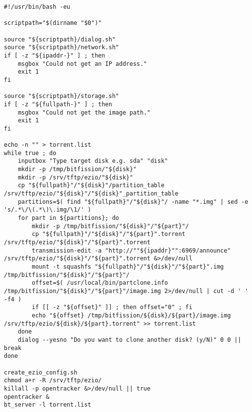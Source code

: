 \begin{minipage}{\textwidth}
\begin{lstlisting}[caption={The Shell Script of BitFission Server}]
#!/usr/bin/bash -eu

scriptpath="$(dirname "$0")"

source "${scriptpath}/dialog.sh"
source "${scriptpath}/network.sh"
if [ -z "${ipaddr-}" ] ; then
	msgbox "Could not get an IP address."
	exit 1
fi

source "${scriptpath}/storage.sh"
if [ -z "${fullpath-}" ] ; then
	msgbox "Could not get the image path."
	exit 1
fi

echo -n "" > torrent.list
while true ; do
	inputbox "Type target disk e.g. sda" "disk"
	mkdir -p /tmp/bitfission/"${disk}"
	mkdir -p /srv/tftp/ezio/"${disk}"
	cp "${fullpath}"/"${disk}"/partition_table /srv/tftp/ezio/"${disk}"/"${disk}"_partition_table
	partitions=$( find "${fullpath}"/"${disk}"/ -name "*.img" | sed -e 's/.*\/\(.*\)\.img/\1/' )
	for part in ${partitions}; do
		mkdir -p /tmp/bitfission/"${disk}"/"${part}"/
		cp "${fullpath}"/"${disk}"/"${part}".torrent /srv/tftp/ezio/"${disk}"/"${part}".torrent
		transmission-edit -a "http://""${ipaddr}"":6969/announce" /srv/tftp/ezio/"${disk}"/"${part}".torrent &>/dev/null
		mount -t squashfs "${fullpath}"/"${disk}"/"${part}".img /tmp/bitfission/"${disk}"/"${part}"/
		offset=$( /usr/local/bin/partclone.info /tmp/bitfission/"${disk}"/"${part}"/image.img 2>/dev/null | cut -d ' ' -f4 )
		if [[ -z "${offset}" ]] ; then offset="0" ; fi
		echo "${offset} /tmp/bitfission/${disk}/${part}/image.img /srv/tftp/ezio/${disk}/${part}.torrent" >> torrent.list
	done
	dialog --yesno "Do you want to clone another disk? (y/N)" 0 0 || break
done

create_ezio_config.sh
chmod a+r -R /srv/tftp/ezio/
killall -p opentracker &>/dev/null || true
opentracker &
bt_server -l torrent.list
\end{lstlisting}
\end{minipage}
